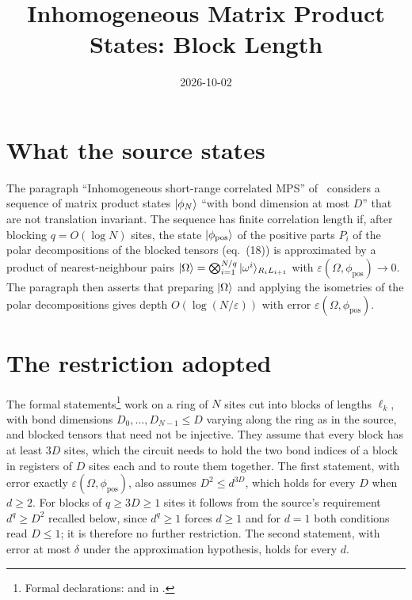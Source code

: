 \documentclass{article}
\title{Inhomogeneous Matrix Product States: Block Length}
\author{}
\date{2026-10-02}
\begin{document}
\maketitle
{}

\section{What the source states}
The paragraph ``Inhomogeneous short-range correlated MPS''
of~\cite{Malz2024Preparation} considers a sequence of matrix product states
$|\phi_N\rangle$ ``with bond dimension at most $D$'' that are not translation
invariant. The sequence has finite correlation length if, after blocking
$q=O(\log N)$ sites, the state $|\phi_{\mathrm{pos}}\rangle$ of the positive parts
$P_i$ of the polar decompositions of the blocked tensors (eq.~(18)) is
approximated by a product of nearest-neighbour pairs
$|\Omega\rangle=\bigotimes_{i=1}^{N/q}|\omega^i\rangle_{R_iL_{i+1}}$ with
$\varepsilon(\Omega,\phi_{\mathrm{pos}})\to0$. The paragraph then asserts that
preparing $|\Omega\rangle$ and applying the isometries of the polar decompositions
gives depth $O(\log(N/\varepsilon))$ with error
$\varepsilon(\Omega,\phi_{\mathrm{pos}})$.

\section{The restriction adopted}
The formal statements\footnote{Formal declarations:
    and 
    in .}
work on a ring of $N$ sites cut into blocks of lengths $\ell_k$, with bond
dimensions $D_0,\dots,D_{N-1}\le D$ varying along the ring as in the source,
and blocked tensors that need not be injective. They assume that every block
has at least $3D$ sites, which the circuit needs to hold the two bond indices of
a block in registers of $D$ sites each and to route them together. The first
statement, with error exactly $\varepsilon(\Omega,\phi_{\mathrm{pos}})$, also
assumes $D^2\le d^{3D}$, which holds for every $D$ when $d\ge2$. For blocks of
$q\ge3D\ge1$ sites it follows from the source's requirement $d^q\ge D^2$
recalled below, since $d^q\ge1$ forces $d\ge1$ and for $d=1$ both conditions
read $D\le1$; it is therefore no further restriction. The second statement,
with error at most $\delta$ under the approximation hypothesis, holds for
every $d$.
\end{document}
